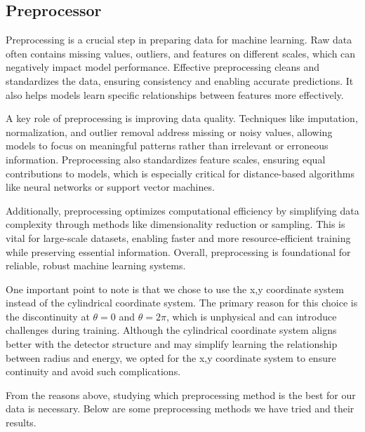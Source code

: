 \subsection{Preprocessor}

Preprocessing is a crucial step in preparing data for machine learning. Raw data often contains missing values, outliers, and features on different scales, which can negatively impact model performance. Effective preprocessing cleans and standardizes the data, ensuring consistency and enabling accurate predictions. It also helps models learn specific relationships between features more effectively.

A key role of preprocessing is improving data quality. Techniques like imputation, normalization, and outlier removal address missing or noisy values, allowing models to focus on meaningful patterns rather than irrelevant or erroneous information. Preprocessing also standardizes feature scales, ensuring equal contributions to models, which is especially critical for distance-based algorithms like neural networks or support vector machines.

Additionally, preprocessing optimizes computational efficiency by simplifying data complexity through methods like dimensionality reduction or sampling. This is vital for large-scale datasets, enabling faster and more resource-efficient training while preserving essential information. Overall, preprocessing is foundational for reliable, robust machine learning systems.

One important point to note is that we chose to use the x,y coordinate system instead of the cylindrical coordinate system. The primary reason for this choice is the discontinuity at $\theta=0$ and $\theta=2\pi$, which is unphysical and can introduce challenges during training. Although the cylindrical coordinate system aligns better with the detector structure and may simplify learning the relationship between radius and energy, we opted for the x,y coordinate system to ensure continuity and avoid such complications. 

From the reasons above, studying which preprocessing method is the best for our data is necessary. Below are some preprocessing methods we have tried and their results.

